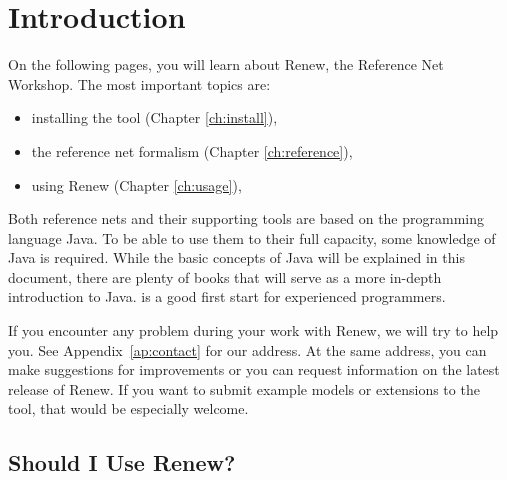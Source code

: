 \chapter{Introduction}

On the following pages, you will learn about Renew, the
Reference Net Workshop. The most important topics
are:
\begin{itemize}
\item installing the tool (Chapter \ref{ch:install}),
\item the reference net formalism (Chapter \ref{ch:reference}),
\item using Renew (Chapter \ref{ch:usage}),
\end{itemize}
Both reference nets and their supporting tools are based
on the programming language Java. To be able to use them
to their full capacity, some knowledge of Java is required.
While the basic concepts of Java will be explained in this document,
there are plenty of books that will serve as a more in-depth
introduction to Java. \cite{vdLinden96} is a good first start for 
experienced programmers.

If you encounter any problem during your work with Renew,
we will try to help you. See Appendix~\ref{ap:contact}
for our address. At the same address, you can make suggestions
for improvements or you can request information on the latest
release of Renew. If you want to submit example models or
extensions to the tool, that would be especially welcome.


\section{Should I Use Renew?}

